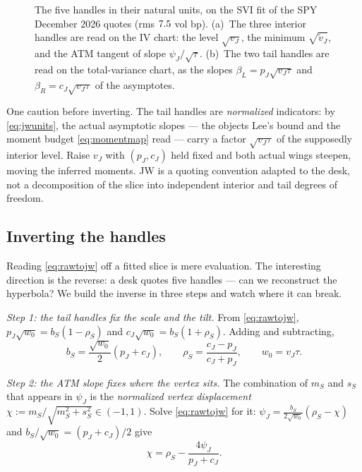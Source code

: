\begin{figure}[htbp]
\centering
{}
\caption{The five handles in their natural units, on the SVI fit of the
SPY December 2026 quotes (rms $7.5$ vol bp).  (a)~The three
interior handles are read on the IV chart: the level $\sqrt{v_J}$, the
minimum $\sqrt{\tilde v_J}$, and the ATM tangent of slope
$\psi_J/\sqrt\tau$.  (b)~The two tail handles are read on the
total-variance chart, as the slopes $\beta_L=p_J\sqrt{v_J\tau}$ and
$\beta_R=c_J\sqrt{v_J\tau}$ of the asymptotes.}
\label{fig:svihandles}
\end{figure}

One caution before inverting.  The tail handles are \emph{normalized}
indicators: by \eqref{eq:jwunits}, the actual asymptotic slopes --- the
objects Lee's bound and the moment budget \eqref{eq:momentmap} read ---
carry a factor $\sqrt{v_J\tau}$ of the supposedly interior level.
Raise $v_J$ with $(p_J,c_J)$ held fixed and both actual wings steepen,
moving the inferred moments.  JW is a quoting convention adapted to the
desk, not a decomposition of the slice into independent interior and
tail degrees of freedom.

\subsection{Inverting the handles}

Reading \eqref{eq:rawtojw} off a fitted slice is mere evaluation.  The
interesting direction is the reverse: a desk quotes five handles ---
can we reconstruct the hyperbola?  We build the inverse in three steps
and watch where it can break.

\emph{Step 1: the tail handles fix the scale and the tilt.}  From
\eqref{eq:rawtojw}, $p_J\sqrt{w_0}=b_S(1-\rho_S)$ and
$c_J\sqrt{w_0}=b_S(1+\rho_S)$.  Adding and subtracting,
\begin{equation}
b_S=\frac{\sqrt{w_0}}{2}(p_J+c_J),\qquad
\rho_S=\frac{c_J-p_J}{c_J+p_J},\qquad w_0=v_J\tau .
\label{eq:invwings}
\end{equation}

\emph{Step 2: the ATM slope fixes where the vertex sits.}  The
combination of $m_S$ and $s_S$ that appears in $\psi_J$ is the
\emph{normalized vertex displacement}
$\chi:=m_S/\sqrt{m_S^2+s_S^2}\in(-1,1)$.  Solve \eqref{eq:rawtojw} for
it: $\psi_J=\tfrac{b_S}{2\sqrt{w_0}}(\rho_S-\chi)$ and
$b_S/\sqrt{w_0}=(p_J+c_J)/2$ give
\begin{equation}
\chi=\rho_S-\frac{4\psi_J}{p_J+c_J}.
\label{eq:chidef}
\end{equation}


